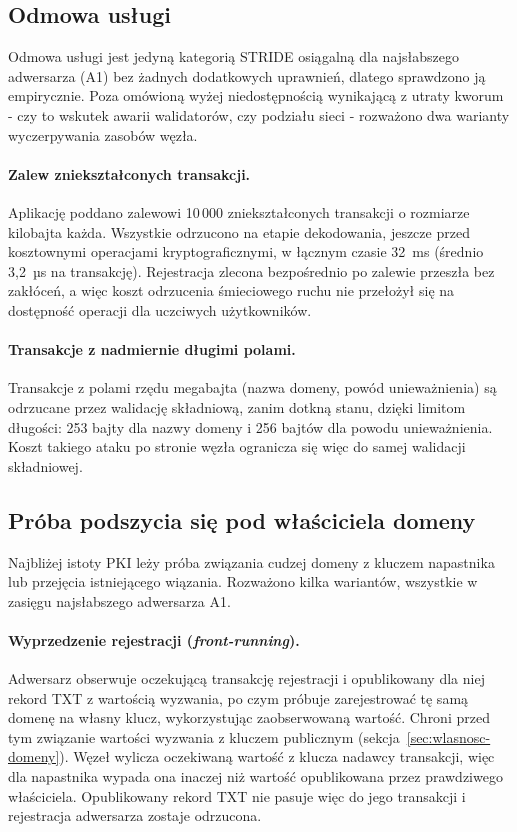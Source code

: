 \subsection{Odmowa usługi}
\label{subsec:odmowa-uslugi}

Odmowa usługi jest jedyną kategorią STRIDE osiągalną dla najsłabszego adwersarza (A1) bez żadnych dodatkowych uprawnień, dlatego sprawdzono ją empirycznie. Poza omówioną wyżej niedostępnością wynikającą z utraty kworum - czy to wskutek awarii walidatorów, czy podziału sieci - rozważono dwa warianty wyczerpywania zasobów węzła.

\paragraph{Zalew zniekształconych transakcji.} Aplikację poddano zalewowi 10\,000 zniekształconych transakcji o rozmiarze kilobajta każda. Wszystkie odrzucono na etapie dekodowania, jeszcze przed kosztownymi operacjami kryptograficznymi, w łącznym czasie 32~ms (średnio 3,2~µs na transakcję). Rejestracja zlecona bezpośrednio po zalewie przeszła bez zakłóceń, a więc koszt odrzucenia śmieciowego ruchu nie przełożył się na dostępność operacji dla uczciwych użytkowników.

\paragraph{Transakcje z nadmiernie długimi polami.} Transakcje z polami rzędu megabajta (nazwa domeny, powód unieważnienia) są odrzucane przez walidację składniową, zanim dotkną stanu, dzięki limitom długości: 253 bajty dla nazwy domeny i 256 bajtów dla powodu unieważnienia. Koszt takiego ataku po stronie węzła ogranicza się więc do samej walidacji składniowej.

\subsection{Próba podszycia się pod właściciela domeny}
\label{subsec:podszycie-domeny}

Najbliżej istoty PKI leży próba związania cudzej domeny z kluczem napastnika lub przejęcia istniejącego wiązania. Rozważono kilka wariantów, wszystkie w zasięgu najsłabszego adwersarza A1.

\paragraph{Wyprzedzenie rejestracji (\emph{front-running}).} Adwersarz obserwuje oczekującą transakcję rejestracji i opublikowany dla niej rekord TXT z wartością wyzwania, po czym próbuje zarejestrować tę samą domenę na własny klucz, wykorzystując zaobserwowaną wartość. Chroni przed tym związanie wartości wyzwania z kluczem publicznym (sekcja~\ref{sec:wlasnosc-domeny}). Węzeł wylicza oczekiwaną wartość z klucza nadawcy transakcji, więc dla napastnika wypada ona inaczej niż wartość opublikowana przez prawdziwego właściciela. Opublikowany rekord TXT nie pasuje więc do jego transakcji i rejestracja adwersarza zostaje odrzucona.

